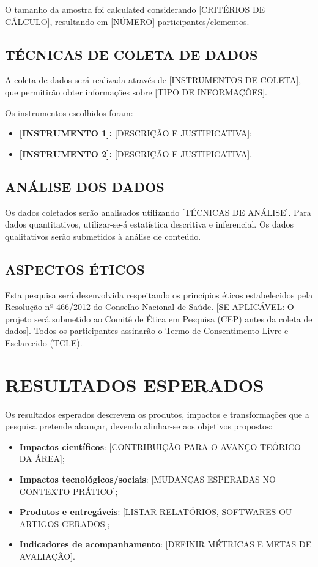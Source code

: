 \documentclass[
    12pt,        %
    openany,     %
    oneside,     %
    a4paper,     %
    english,     %
    brazil,      %
    article      %
]{abntex2}
\begin{document}
O tamanho da amostra foi calculated considerando [CRITÉRIOS DE CÁLCULO], resultando em [NÚMERO] participantes/elementos.

\subsection{TÉCNICAS DE COLETA DE DADOS}
\label{subsec:coleta-dados}

A coleta de dados será realizada através de [INSTRUMENTOS DE COLETA], que permitirão obter informações sobre [TIPO DE INFORMAÇÕES].

Os instrumentos escolhidos foram:
\begin{itemize}
    \item \textbf{[INSTRUMENTO 1]:} [DESCRIÇÃO E JUSTIFICATIVA];
    \item \textbf{[INSTRUMENTO 2]:} [DESCRIÇÃO E JUSTIFICATIVA].
\end{itemize}

\subsection{ANÁLISE DOS DADOS}
\label{subsec:analise-dados}

Os dados coletados serão analisados utilizando [TÉCNICAS DE ANÁLISE]. Para dados quantitativos, utilizar-se-á estatística descritiva e inferencial. Os dados qualitativos serão submetidos à análise de conteúdo.

\subsection{ASPECTOS ÉTICOS}
\label{subsec:aspectos-eticos}

Esta pesquisa será desenvolvida respeitando os princípios éticos estabelecidos pela Resolução nº 466/2012 do Conselho Nacional de Saúde. [SE APLICÁVEL: O projeto será submetido ao Comitê de Ética em Pesquisa (CEP) antes da coleta de dados]. Todos os participantes assinarão o Termo de Consentimento Livre e Esclarecido (TCLE).


\section{RESULTADOS ESPERADOS}
\label{sec:resultados-esperados}

Os resultados esperados descrevem os produtos, impactos e transformações que a pesquisa pretende alcançar, devendo alinhar-se aos objetivos propostos:

\begin{itemize}
    \item \textbf{Impactos científicos}: [CONTRIBUIÇÃO PARA O AVANÇO TEÓRICO DA ÁREA];
    \item \textbf{Impactos tecnológicos/sociais}: [MUDANÇAS ESPERADAS NO CONTEXTO PRÁTICO];
    \item \textbf{Produtos e entregáveis}: [LISTAR RELATÓRIOS, SOFTWARES OU ARTIGOS GERADOS];
    \item \textbf{Indicadores de acompanhamento}: [DEFINIR MÉTRICAS E METAS DE AVALIAÇÃO].
\end{itemize}
\end{document}
